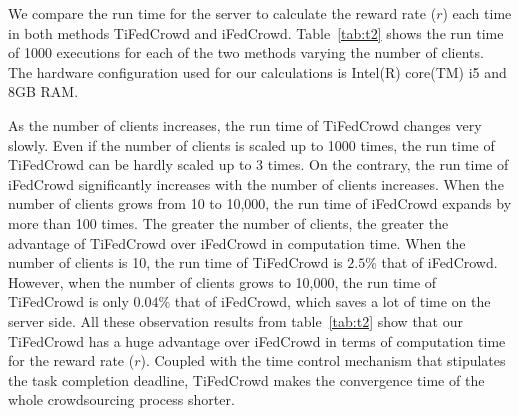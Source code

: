 \documentclass[final,1p,times]{elsarticle}
\begin{document}
We compare the run time for the server to calculate the reward rate ($r$) each time in both methods TiFedCrowd and iFedCrowd. Table~\ref{tab:t2} shows the run time of 1000 executions for each of the two methods varying the number of clients. The hardware configuration used for our calculations is Intel(R) core(TM) i5 and 8GB RAM.

\begin{table}
	\caption{The run time (in second) for the server to calculate the reward rate ($r$)}
	\centering
	\label{tab:t2}
\end{table}

As the number of clients increases, the run time of TiFedCrowd changes very slowly. Even if the number of clients is scaled up to 1000 times, the run time of TiFedCrowd can be hardly scaled up to 3 times. On the contrary, the run time of iFedCrowd significantly increases with the number of clients increases. When the number of clients grows from 10 to 10,000, the run time of iFedCrowd expands by more than 100 times. The greater the number of clients, the greater the advantage of TiFedCrowd over iFedCrowd in computation time. When the number of clients is 10, the run time of TiFedCrowd is $2.5\%$ that of iFedCrowd. However, when the number of clients grows to 10,000, the run time of TiFedCrowd is only $0.04\%$ that of iFedCrowd, which saves a lot of time on the server side. All these observation results from table~\ref{tab:t2} show that our TiFedCrowd has a huge advantage over iFedCrowd in terms of computation time for the reward rate ($r$). Coupled with the time control mechanism that stipulates the task completion deadline, TiFedCrowd makes the convergence time of the whole crowdsourcing process shorter.
\end{document}
